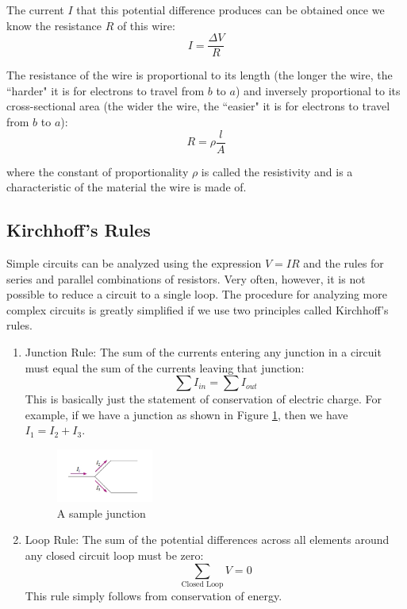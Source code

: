 The current $I$ that this potential difference produces can be obtained once we know the resistance $R$ of this wire:
\begin{equation}
	I = \frac{\Delta V}{R}
\end{equation}

The resistance of the wire is proportional to its length (the longer the wire, the ``harder" it is for electrons to travel from $b$ to $a$) and inversely proportional to its cross-sectional area (the wider the wire, the ``easier" it is for electrons to travel from $b$ to $a$):
\begin{equation}
	R = \rho \frac{l}{A}
\end{equation}

where the constant of proportionality $\rho$ is called the resistivity and is a characteristic of the material the wire is made of.

\subsection{Kirchhoff's Rules}

Simple circuits can be analyzed using the expression $V = IR$ and the rules for series and parallel combinations of resistors. Very often, however, it is not possible to reduce a circuit to a single loop. The procedure for analyzing more complex circuits is greatly simplified if we use two principles called Kirchhoff's rules.\myskip

\begin{enumerate}
	\item Junction Rule: The sum of the currents entering any junction in a circuit must equal the sum of the currents leaving that junction:
	\begin{equation}
		\sum I_{in} = \sum I_{out}
	\end{equation}
	This is basically just the statement of conservation of electric charge. For example, if we have a junction as shown in Figure \ref{fig:junction}, then we have $I_1 = I_2 + I_3$.

	\begin{figure}[h]
	\centering
	\includegraphics[width=0.3\textwidth]{./Exp2/pic/junction.png}
	\caption{A sample junction}
	\label{fig:junction}
	\end{figure}

	\item Loop Rule: The sum of the potential differences across all elements around any closed circuit loop must be zero:
	\begin{equation}
		\sum_{\text{Closed Loop}} V = 0
	\end{equation}
	This rule simply follows from conservation of energy.

\end{enumerate}

